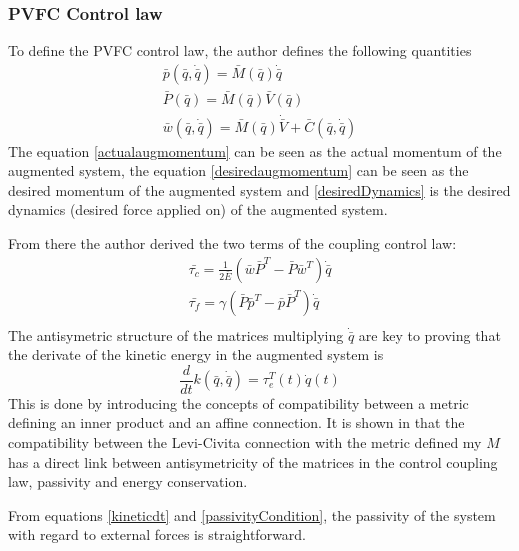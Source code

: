 \subsubsection{PVFC Control law}
To define the PVFC control law, the author defines the following quantities
\begin{align}
    \bar{p}(\bar{q}, \dot{\bar{q}}) = \bar{M}(\bar{q})\dot{\bar{q}} \label{actualaugmomentum}\\
    \bar{P}(\bar{q}) = \bar{M}(\bar{q})\bar{V}(\bar{q}) \label{desiredaugmomentum}\\
    \bar{w}(\bar{q}, \dot{\bar{q}}) = \bar{M}(\bar{q})\dot{\bar{V}} + \bar{C}(\bar{q}, \dot{\bar{q}}) \label{desiredDynamics}
\end{align}
The equation \ref{actualaugmomentum} can be seen as the actual momentum of the augmented system, the equation \ref{desiredaugmomentum} can be seen 
as the desired momentum of the augmented system and \ref{desiredDynamics} is the desired dynamics (desired force applied on) of the augmented system.


From there the author derived the two terms of the coupling control law: 
\begin{align}
    \bar{\tau_c} = \frac{1}{2\bar{E}}(\bar{w}\bar{P}^T - \bar{P}\bar{w}^T ) \dot{\bar{q}} \label{tauc}\\
    \bar{\tau_f} = \gamma(\bar{P}\bar{p}^T - \bar{p}\bar{P}^T ) \dot{\bar{q}} \label{tauf}\\
\end{align}
The antisymetric structure of the matrices multiplying $\dot{\bar{q}}$ are key to proving that the derivate of the kinetic energy in the augmented system is 
\begin{equation}
    \frac{d}{dt}k(\bar{q}, \dot{\bar{q}}) = \tau_e^T(t)\dot{q}(t) \label{kineticdt}
\end{equation}
This is done by introducing the concepts of compatibility between a metric defining an inner product and an affine connection. It is shown in \cite{li2001passive} that the compatibility between the Levi-Civita connection with the metric defined my $M$ has a direct link between antisymetricity of the matrices in the control coupling law, passivity and energy conservation.

From equations \ref{kineticdt} and \ref{passivityCondition}, the passivity of the system with regard to external forces is straightforward.

